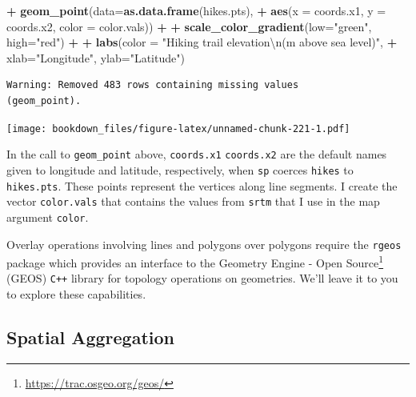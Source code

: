 \documentclass[
]{krantz}
\makeatletter
\newenvironment{Shaded}{\begin{snugshade}}{\end{snugshade}}
\newcommand{\CharTok}[1]{\textcolor[rgb]{0.5,0.5,0.5}{#1}}
\newcommand{\DataTypeTok}[1]{\textcolor[rgb]{0.27,0.27,0.27}{#1}}
\newcommand{\KeywordTok}[1]{\textcolor[rgb]{0.27,0.27,0.27}{\textbf{#1}}}
\newcommand{\NormalTok}[1]{#1}
\newcommand{\OperatorTok}[1]{\textcolor[rgb]{0.43,0.43,0.43}{\textbf{#1}}}
\newcommand{\StringTok}[1]{\textcolor[rgb]{0.5,0.5,0.5}{#1}}
\renewcommand{\href}[2]{#2\footnote{\url{#1}}}
\newenvironment{kframe}{%
\medskip{}
\setlength{\fboxsep}{.8em}
 \def\at@end@of@kframe{}%
 \ifinner\ifhmode%
  \def\at@end@of@kframe{\end{minipage}}%
  \begin{minipage}{\columnwidth}%
 \fi\fi%
 \def\FrameCommand##1{\hskip\@totalleftmargin \hskip-\fboxsep
 \colorbox{shadecolor}{##1}\hskip-\fboxsep
     \hskip-\linewidth \hskip-\@totalleftmargin \hskip\columnwidth}%
 \MakeFramed {\advance\hsize-\width
   \@totalleftmargin\z@ \linewidth\hsize
   \@setminipage}}%
 {\par\unskip\endMakeFramed%
 \at@end@of@kframe}
\renewenvironment{Shaded}{\begin{kframe}}{\end{kframe}}
\makeatother
\begin{document}
\begin{Shaded}
\begin{Highlighting}[]
\OperatorTok{+}\StringTok{     }\KeywordTok{geom\_point}\NormalTok{(}\DataTypeTok{data=}\KeywordTok{as.data.frame}\NormalTok{(hikes.pts),}
\OperatorTok{+}\StringTok{                }\KeywordTok{aes}\NormalTok{(}\DataTypeTok{x =}\NormalTok{ coords.x1, }\DataTypeTok{y =}\NormalTok{ coords.x2, }\DataTypeTok{color =}\NormalTok{ color.vals)) }\OperatorTok{+}
\OperatorTok{+}\StringTok{     }\KeywordTok{scale\_color\_gradient}\NormalTok{(}\DataTypeTok{low=}\StringTok{"green"}\NormalTok{, }\DataTypeTok{high=}\StringTok{"red"}\NormalTok{) }\OperatorTok{+}
\OperatorTok{+}\StringTok{     }\KeywordTok{labs}\NormalTok{(}\DataTypeTok{color =} \StringTok{"Hiking trail elevation}\CharTok{\textbackslash{}n}\StringTok{(m above sea level)"}\NormalTok{,}
\OperatorTok{+}\StringTok{          }\DataTypeTok{xlab=}\StringTok{"Longitude"}\NormalTok{, }\DataTypeTok{ylab=}\StringTok{"Latitude"}\NormalTok{)}
\end{Highlighting}
\end{Shaded}

\begin{verbatim}
Warning: Removed 483 rows containing missing values
(geom_point).
\end{verbatim}

\texttt{[image: bookdown\_files/figure-latex/unnamed-chunk-221-1.pdf]}

In the call to \texttt{geom\_point} above, \texttt{coords.x1} \texttt{coords.x2} are the default names given to longitude and latitude, respectively, when \texttt{sp} coerces \texttt{hikes} to \texttt{hikes.pts}. These points represent the vertices along line segments. I create the vector \texttt{color.vals} that contains the values from \texttt{srtm} that I use in the map argument \texttt{color}.

Overlay operations involving lines and polygons over polygons require the \texttt{rgeos} package which provides an interface to the \href{https://trac.osgeo.org/geos/}{Geometry Engine - Open Source} (GEOS) \texttt{C++} library for topology operations on geometries. We'll leave it to you to explore these capabilities.

\hypertarget{spatial-aggregation}{%
\subsection{Spatial Aggregation}\label{spatial-aggregation}}
\end{document}
